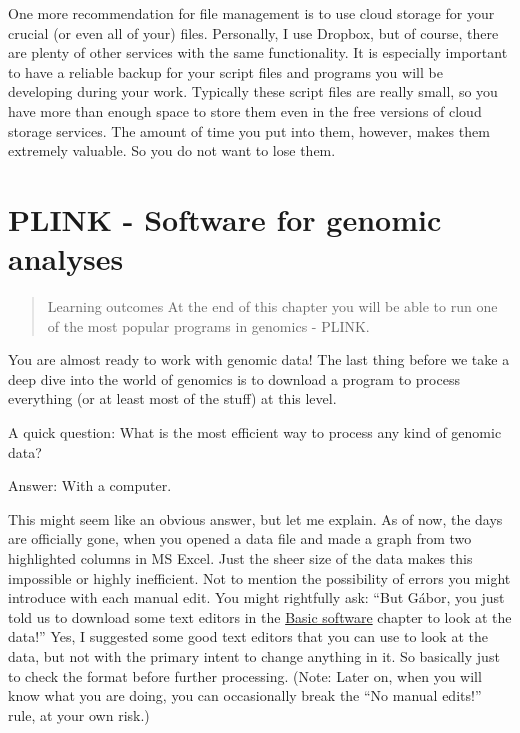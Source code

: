 \documentclass[]{book}
\begin{document}
One more recommendation for file management is to use cloud storage for
your crucial (or even all of your) files. Personally, I use Dropbox, but
of course, there are plenty of other services with the same
functionality. It is especially important to have a reliable backup for
your script files and programs you will be developing during your work.
Typically these script files are really small, so you have more than
enough space to store them even in the free versions of cloud storage
services. The amount of time you put into them, however, makes them
extremely valuable. So you do not want to lose them.

\hypertarget{plink---software-for-genomic-analyses}{\chapter{PLINK -
Software for genomic
analyses}\label{plink---software-for-genomic-analyses}}

\begin{quote}
Learning outcomes At the end of this chapter you will be able to run one
of the most popular programs in genomics - PLINK.
\end{quote}

You are almost ready to work with genomic data! The last thing before we
take a deep dive into the world of genomics is to download a program to
process everything (or at least most of the stuff) at this level.

A quick question: What is the most efficient way to process any kind of
genomic data?

Answer: With a computer.

This might seem like an obvious answer, but let me explain. As of now,
the days are officially gone, when you opened a data file and made a
graph from two highlighted columns in MS Excel. Just the sheer size of
the data makes this impossible or highly inefficient. Not to mention the
possibility of errors you might introduce with each manual edit. You
might rightfully ask: ``But Gábor, you just told us to download some
text editors in the \protect\hyperlink{basic-software}{Basic software}
chapter to look at the data!'' Yes, I suggested some good text editors
that you can use to look at the data, but not with the primary intent to
change anything in it. So basically just to check the format before
further processing. (Note: Later on, when you will know what you are
doing, you can occasionally break the ``No manual edits!'' rule, at your
own risk.)
\end{document}

